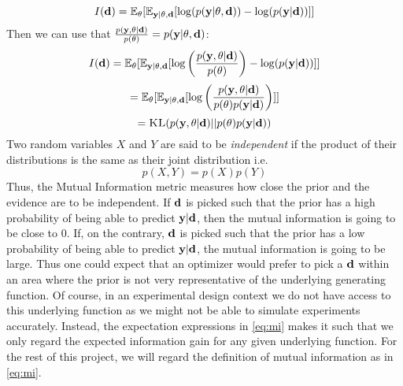 \begin{equation} I(\mathbf{d})  = \mathbb{E}_{\mathbf{\theta}}[\mathbb{E}_{\mathbf{y} | \theta, \mathbf{d}} [\log(p(\mathbf{y} | \mathbf{\theta}, \mathbf{d})) - \log(p(\mathbf{y}|\mathbf{d}))]]\end{equation} 
Then we can use that $\frac{p(\mathbf{y}, \mathbf{\theta}|\mathbf{d})}{p(\theta)}=p(\mathbf{y| \theta, \mathbf{d}})$:
\begin{equation} I(\mathbf{d})  = \mathbb{E}_{\mathbf{\theta}}[\mathbb{E}_{\mathbf{y} | \theta, \mathbf{d}} [\log\left(\frac{p(\mathbf{y}, \mathbf{\theta}|\mathbf{d})}{p(\theta)}\right) - \log(p(\mathbf{y}|\mathbf{d}))]]\end{equation}
\begin{equation}= \mathbb{E}_{\mathbf{\theta}}[\mathbb{E}_{\mathbf{y} | \theta, \mathbf{d}} [\log\left(\frac{p(\mathbf{y}, \mathbf{\theta}|\mathbf{d})}{p(\theta)p(\mathbf{y}|\mathbf{d})}\right)]]\end{equation}
$$ = \textsc{KL}(p(\mathbf{y}, \theta | \mathbf{d})|| p(\theta)p(\mathbf{y}|\mathbf{d}))$$
Two random variables $X$ and $Y$ are said to be \textit{independent} if the product of their distributions is the same as their joint distribution i.e.
\begin{equation}p(X,Y) = p(X)p(Y)\end{equation}
Thus, the Mutual Information metric measures how close the prior and the evidence are to be independent. 
If $\mathbf{d}$ is picked such that the prior has a high probability of being able to predict $\mathbf{y}|\mathbf{d}$, then the mutual information is going to be close to 0. 
If, on the contrary, $\mathbf{d}$ is picked such that the prior has a low probability of being able to predict $\mathbf{y}|\mathbf{d}$, the mutual information is going to be large.
Thus one could expect that an optimizer would prefer to pick a $\mathbf{d}$ within an area where the prior is not very representative of the underlying generating function.
Of course, in an experimental design context we do not have access to this underlying function as we might not be able to simulate experiments accurately. Instead, the expectation expressions in \eqref{eq:mi}
makes it such that we only regard the expected information gain for any given underlying function.
For the rest of this project, we will regard the definition of mutual information as in \eqref{eq:mi}.

